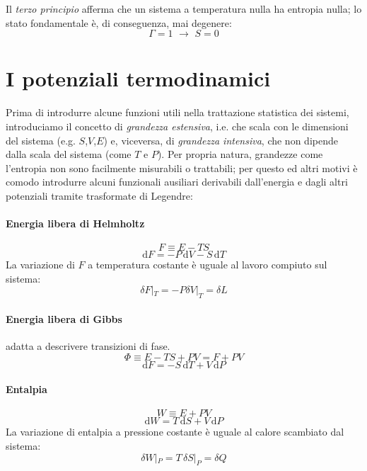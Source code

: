 \documentclass[a4paper]{report}
\begin{document}
Il \textit{terzo principio} afferma che un sistema a temperatura nulla ha entropia nulla; lo stato fondamentale è, di conseguenza, mai degenere:
\begin{equation}
    \Gamma = 1\,\, \rightarrow \,\,S = 0
\end{equation}

\section{I potenziali termodinamici}
Prima di introdurre alcune funzioni utili nella trattazione statistica dei sistemi, introduciamo il concetto di \textit{grandezza estensiva}, i.e. che scala con le dimensioni del sistema (e.g. $S$,$V$,$E$) e, viceversa, di \textit{grandezza intensiva}, che non dipende dalla scala del sistema (come $T$ e $P$). Per propria natura, grandezze come l'entropia non sono facilmente misurabili o trattabili; per questo ed altri motivi è comodo introdurre alcuni funzionali ausiliari derivabili dall'energia e dagli altri potenziali tramite trasformate di Legendre:
\paragraph{Energia libera di Helmholtz}
\begin{equation}
    F \equiv E - TS 
\end{equation}
\begin{equation}
    \mathrm{d}F = -P\,\mathrm{d}V - S\,\mathrm{d}T
\end{equation}
La variazione di $F$ a temperatura costante è uguale al lavoro compiuto sul sistema:
\begin{equation}
    \delta F |_T = -P \delta V |_T = \delta L
\end{equation}
\paragraph{Energia libera di Gibbs} adatta a descrivere transizioni di fase.
\begin{equation}
    \Phi \equiv E - TS + PV = F + PV
\end{equation}
\begin{equation}
    \mathrm{d}F = -S\,\mathrm{d}T +V\,\mathrm{d}P
\end{equation}
\paragraph{Entalpia}
\begin{equation}
   W \equiv E + PV
\end{equation}
\begin{equation}
    \mathrm{d}W = T\,\mathrm{d}S +V\,\mathrm{d}P
\end{equation}
La variazione di entalpia a pressione costante è uguale al calore scambiato dal sistema:
\begin{equation}
    \delta W |_P = T \,\delta S |_P = \delta Q
\end{equation}
\end{document}
